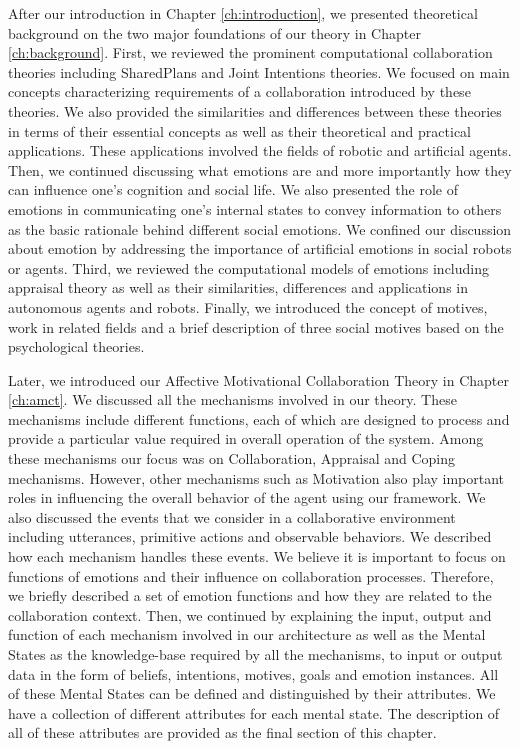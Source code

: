 \documentclass[12pt]{report}
\begin{document}
After our introduction in Chapter \ref{ch:introduction}, we presented theoretical
background on the two major foundations of our theory in Chapter
\ref{ch:background}. First, we reviewed the prominent computational
collaboration theories including SharedPlans and Joint Intentions theories. We
focused on main concepts characterizing requirements of a collaboration
introduced by these theories. We also provided the similarities and differences
between these theories in terms of their essential concepts as well as their
theoretical and practical applications. These applications involved the fields
of robotic and artificial agents. Then, we continued discussing what emotions
are and more importantly how they can influence one's cognition and social life.
We also presented the role of emotions in communicating one's internal states to
convey information to others as the basic rationale behind different social
emotions. We confined our discussion about emotion by addressing the importance
of artificial emotions in social robots or agents. Third, we reviewed the
computational models of emotions including appraisal theory as well as their
similarities, differences and applications in autonomous agents and robots.
Finally, we introduced the concept of motives, work in related fields and a
brief description of three social motives based on the psychological theories.

Later, we introduced our Affective Motivational Collaboration Theory in Chapter
\ref{ch:amct}. We discussed all the mechanisms involved in our theory. These
mechanisms include different functions, each of which are designed to process
and provide a particular value required in overall operation of the system. Among
these mechanisms our focus was on Collaboration, Appraisal and Coping mechanisms.
However, other mechanisms such as Motivation also play important roles in
influencing the overall behavior of the agent using our framework. We also
discussed the events that we consider in a collaborative environment including
utterances, primitive actions and observable behaviors. We described how each
mechanism handles these events. We believe it is important to focus on functions
of emotions and their influence on collaboration processes. Therefore, we
briefly described a set of emotion functions and how they are related to the
collaboration context. Then, we continued by explaining the input, output and
function of each mechanism involved in our architecture as well as the Mental
States as the knowledge-base required by all the mechanisms, to input or output
data in the form of beliefs, intentions, motives, goals and emotion instances.
All of these Mental States can be defined and distinguished by their attributes.
We have a collection of different attributes for each mental state. The
description of all of these attributes are provided as the final section of this
chapter.
\end{document}

